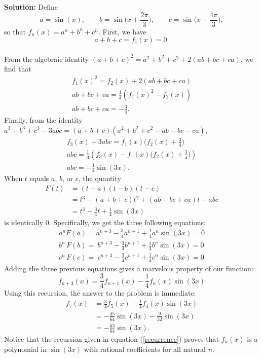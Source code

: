 \documentclass[11pt]{article}
\begin{document}
\noindent \textbf{\large{Solution:}}
%
%
Define
\[
a=\sin(x),\qquad b=\sin\big(x+\frac{2\pi}{3}\big),\qquad c=\sin\big(x+\frac{4\pi}{3}\big),
\]
so that $f_n(x)=a^n+b^n+c^n$.
%
%
First, we have
\[
a+b+c = f_1(x) = 0.
\]
\\
%
%
From the algebraic identity $(a+b+c)^2 = a^2+b^2+c^2+2(ab+bc+ca)$, we find that
\begin{gather*}
f_1(x)^2 = f_2(x)+2(ab+bc+ca)\\
ab+bc+ca = \frac{1}{2}\left(f_1(x)^2-f_2(x)\right)\\
ab+bc+ca = -\frac{3}{4}.
\end{gather*}
%
%
Finally, from the identity $a^3+b^3+c^3-3abc=(a+b+c)(a^2+b^2+c^2-ab-bc-ca)$,
\begin{gather*}
f_3(x)-3abc=f_1(x)\big(f_2(x)+\frac{3}{4}\big)\\
abc=\frac{1}{3}\left(f_3(x)-f_1(x)\big(f_2(x)+\frac{3}{4}\big)\right)\\
abc=-\frac{1}{4}\sin(3x).
\end{gather*}
%
%
When $t$ equals $a$, $b$, or $c$, the quantity
\begin{align*}
F(t)&=(t-a)(t-b)(t-c)\\
&= t^3-(a+b+c)t^2+(ab+bc+ca)t-abc\\
&= t^3-\frac{3}{4}t+\frac{1}{4}\sin(3x)
\end{align*}
is identically 0. Specifically, we get the three following equations:
\begin{gather*}
a^n F(a)=a^{n+3}-\frac{3}{4}a^{n+1}+\frac{1}{4}a^n\sin(3x)=0\\
b^n\,F(b)=\ b^{n+3}-\frac{3}{4}b^{n+1}+\frac{1}{4}b^n\sin(3x)=0\\
c^n\,F(c)=\ c^{n+3}-\frac{3}{4}c^{n+1}+\frac{1}{4}c^n\sin(3x)=0
\end{gather*}
Adding the three previous equations gives a marvelous property of our function:
\begin{equation}\label{recurrence}
f_{n+3}(x)=\frac{3}{4}f_{n+1}(x)-\frac{1}{4}f_n(x)\sin(3x)
\end{equation}
%
%
Using this recursion, the answer to the problem is immediate:
\begin{align*}
f_7(x)&=\frac{3}{4}f_5(x)-\frac{1}{4}f_4(x)\sin(3x)\\
&=-\frac{45}{64}\sin(3x)-\frac{9}{32}\sin(3x)\\
&=-\frac{63}{64}\sin(3x).
\end{align*}
%
%
Notice that the recursion given in equation (\ref{recurrence}) proves that $f_n(x)$ is a polynomial in $\sin(3x)$ with rational coefficients for all natural $n$.
\end{document}
